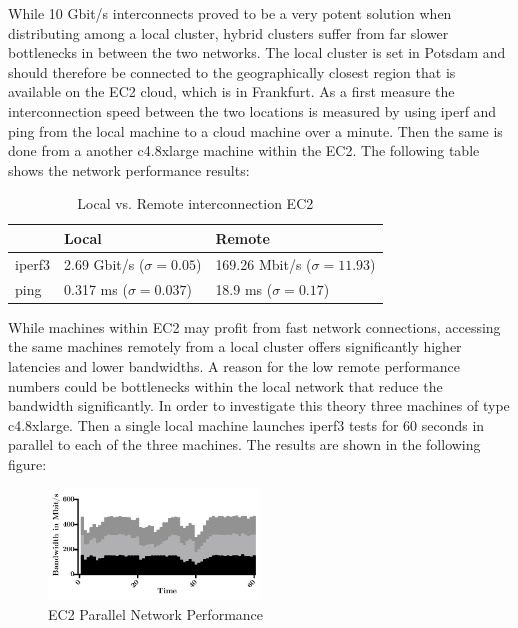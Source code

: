 While 10 Gbit/s interconnects proved to be a very potent solution when distributing among a local cluster, hybrid clusters suffer from far slower bottlenecks in between the two networks. The local cluster is set in Potsdam and should therefore be connected to the geographically closest region that is available on the EC2 cloud, which is in Frankfurt. As a first measure the interconnection speed between the two locations is measured by using iperf and ping from the local machine to a cloud machine over a minute. Then the same is done from a another c4.8xlarge machine within the EC2. The following table shows the network performance results:

\begin{table}[!htb]
	\centering
	\begin{adjustbox}{width=0.5\textwidth}
		\small
		\begin{tabular}{l | l | l}
			~                     & Local                 				& Remote                  \\
			\hline
			iperf3                & 2.69 Gbit/s ($\sigma = 0.05$) 		& 169.26 Mbit/s ($\sigma = 11.93$) \\
			ping                  & 0.317 ms ($\sigma = 0.037$)  		& 18.9 ms ($\sigma = 0.17$)  \\
		\end{tabular}
	\end{adjustbox}
	
	\caption{Local vs. Remote interconnection EC2}
	\label{table:local_vs_remote_ec2}
\end{table}

While machines within EC2 may profit from fast network connections, accessing the same machines remotely from a local cluster offers significantly higher latencies and lower bandwidths. A reason for the low remote performance numbers could be bottlenecks within the local network that reduce the bandwidth significantly. In order to investigate this theory three machines of type c4.8xlarge. Then a single local machine launches iperf3 tests for 60 seconds in parallel to each of the three machines. The results are shown in the following figure:

\begin{figure}[H]
	\includegraphics[width=0.5\textwidth]{images/ec2_stacked_network_performance.pdf}
	\centering
	\caption{EC2 Parallel Network Performance}
	\label{img:EC2 Parallel Network Performance}
\end{figure}

